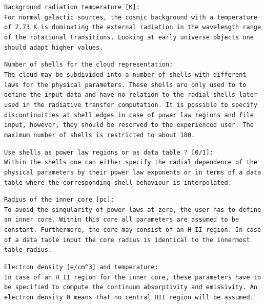 \begin{description}
\item{}\tt Background radiation temperature [K]:\\ \rm
For normal galactic sources, the cosmic background with
a temperature of 2.73 K is dominating the external radiation
in the wavelength range of the rotational transitions. Looking
at early universe objects one should adapt higher values.
\item{}\tt Number of shells for the cloud representation:\\ \rm
The cloud may be subdivided into a number of shells with different
laws for the physical parameters. These shells are only
used to to define the input data and have no relation to the
radial shells later used in the radiative transfer computation.
It is possible to specify discontinuities at shell edges 
in case of power law regions and file input, however, they
should be reserved to the experienced user. The maximum number
of shells is restricted to about 180.
\item{}\tt Use shells as power law regions or as data table ? [0/1]:\\ \rm
Within the shells one can either specify the radial dependence of
the physical parameters by their power law exponents or in terms 
of a data table where the corresponding shell behaviour is interpolated.
\item{}\tt Radius of the inner core [pc]:\\ \rm
To avoid the singularity of power laws at zero, the user has
to define an inner core. Within this core all parameters are assumed
to be constant. Furthermore, the core may consist of an H~II region.
In case of a data table input the core radius is identical to the
innermost table radius.
\item{}\tt Electron density [e/cm\^{}3] and temperature:\\ \rm
In case of an H~II region for the inner core, these parameters
have to be specified to compute the continuum absorptivity and
emissivity. An electron density 0 means that no central HII region 
will be assumed.

\end{description}

